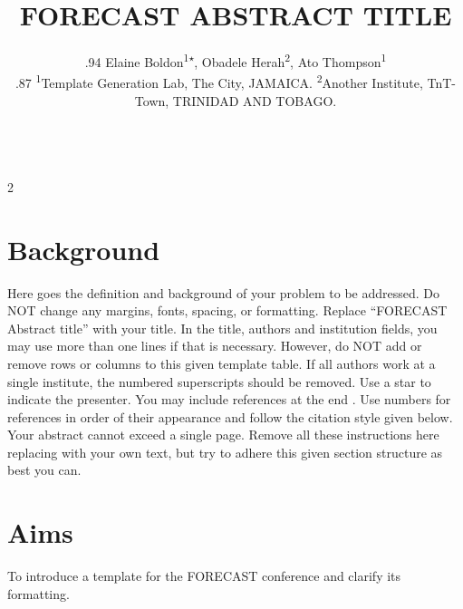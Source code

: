\documentclass[paper=letter,fontsize=11pt]{scrartcl}	 %
\title{\HorRule \fontsize{14}{14}\centering \bfseries \uppercase{
FORECAST Abstract title
%
}}
\author{%
\begin{tabular*}{\textwidth}{@{}p{\textwidth}}{\large\mdseries\begin{spacing}{.94}
Elaine Boldon\textsuperscript{1$\star$},
Obadele Herah\textsuperscript{2},
Ato Thompson\textsuperscript{1}
\end{spacing}}\\[-6ex]
{\begin{spacing}{.87}\footnotesize
\textsuperscript{1}Template Generation Lab, The City, JAMAICA.\quad
\textsuperscript{2}Another Institute, TnT-Town, TRINIDAD AND TOBAGO.
\end{spacing}}
\end{tabular*}
\\[-5.5ex]
\noindent\HorRule %
}
\begin{document}
\onecolumn

\thispagestyle{empty}

\maketitle %

\begin{multicols}{2} 


\section*{Background}

Here goes the definition and background of your problem to be addressed. 
Do NOT change any margins, fonts, spacing, or formatting. Replace ``FORECAST Abstract title'' with your title.
In the title, authors and institution fields, you may use more than one lines if that is necessary.  
However, do NOT add or remove rows or columns to this given template table.
If all authors work at a single institute, the numbered superscripts should be removed. Use a star to indicate the presenter.
You may include references at the end \cite{Mayer24,Athos44}. 
Use numbers for references in order of their appearance and follow the citation style given below. 
Your abstract cannot exceed a single page.  
Remove all these instructions here replacing with your own text, but try to adhere this given section structure as best you can.


\section*{Aims}

To introduce a template for the FORECAST conference and clarify its formatting.



\end{multicols}
\end{document}
